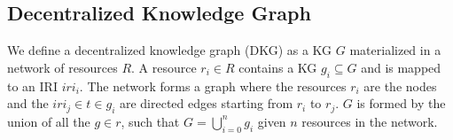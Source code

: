 \subsection{Decentralized Knowledge Graph}
We define a decentralized knowledge graph (DKG) as a KG $G$ materialized in a network of resources $R$.
A resource $r_i \in R$ contains a KG $g_i \subseteq G$ and is mapped to an IRI $iri_i$.
The network forms a graph where the resources $r_i$ are the nodes and the $iri_j \in t \in g_i$ are directed edges starting from $r_i$ to $r_j$.
$G$ is formed by the union of all the $g \in r$, such that $G = \bigcup_{i=0}^{n}g_i$ given $n$ resources in the network.